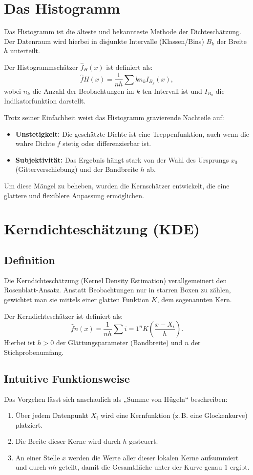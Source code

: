 \documentclass[a4paper,12pt]{article}
\begin{document}
\section{Das Histogramm}
Das Histogramm ist die älteste und bekannteste Methode der Dichteschätzung. Der Datenraum wird hierbei in disjunkte Intervalle (Klassen/Bins) $B_k$ der Breite $h$ unterteilt.

Der Histogrammschätzer $\hat{f}_H(x)$ ist definiert als:
\begin{equation}
    \hat{f}H(x) = \frac{1}{nh} \sum{k} n_k I_{B_k}(x),
\end{equation}
wobei $n_k$ die Anzahl der Beobachtungen im $k$-ten Intervall ist und $I_{B_k}$ die Indikatorfunktion darstellt.

Trotz seiner Einfachheit weist das Histogramm gravierende Nachteile auf:
\begin{itemize}
    \item \textbf{Unstetigkeit:} Die geschätzte Dichte ist eine Treppenfunktion, auch wenn die wahre Dichte $f$ stetig oder differenzierbar ist.
    \item \textbf{Subjektivität:} Das Ergebnis hängt stark von der Wahl des Ursprungs $x_0$ (Gitterverschiebung) und der Bandbreite $h$ ab.
\end{itemize}
Um diese Mängel zu beheben, wurden die Kernschätzer entwickelt, die eine glattere und flexiblere Anpassung ermöglichen.

\section{Kerndichteschätzung (KDE)}

\subsection{Definition}
Die Kerndichteschätzung (Kernel Density Estimation) verallgemeinert den Rosenblatt-Ansatz. Anstatt Beobachtungen nur in starren Boxen zu zählen, gewichtet man sie mittels einer glatten Funktion $K$, dem sogenannten Kern.

Der Kerndichteschätzer ist definiert als:
\begin{equation}
    \hat{f}n(x) = \frac{1}{nh} \sum{i=1}^{n} K\left(\frac{x - X_i}{h}\right).
\end{equation}
Hierbei ist $h > 0$ der Glättungsparameter (Bandbreite) und $n$ der Stichprobenumfang.

\subsection{Intuitive Funktionsweise}
Das Vorgehen lässt sich anschaulich als „Summe von Hügeln“ beschreiben:
\begin{enumerate}
    \item Über jedem Datenpunkt $X_i$ wird eine Kernfunktion (z.\,B. eine Glockenkurve) platziert.
    \item Die Breite dieser Kerne wird durch $h$ gesteuert.
    \item An einer Stelle $x$ werden die Werte aller dieser lokalen Kerne aufsummiert und durch $nh$ geteilt, damit die Gesamtfläche unter der Kurve genau 1 ergibt.
\end{enumerate}
\end{document}

